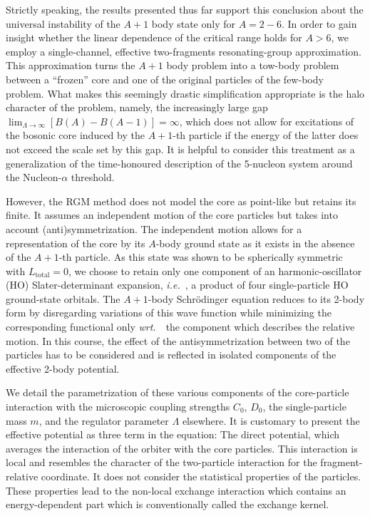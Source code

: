 \documentclass[preprint,12pt]{elsarticle}
\newcommand{\wrt}{\textit{wrt.}~}
\newcommand{\ie}{\textit{i.e.}~}
\begin{document}
Strictly speaking, the results presented thus far support this conclusion about the universal instability of the $A+1$
body state only for $A=2-6$. In order to gain insight whether the linear dependence of the critical range holds for
$A>6$, we employ a single-channel, effective two-fragments resonating-group approximation. This approximation
turns the $A+1$ body problem into a tow-body problem between a ``frozen'' core and one of the original particles of
the few-body problem. What makes this seemingly drastic simplification appropriate is the halo character of the problem,
namely, the increasingly large gap $\lim_{\Lambda\to\infty}\left[B(A)-B(A-1)\right]=\infty$, which does not
allow for excitations of the bosonic core induced by the $A+1$-th particle if the energy of the latter
does not exceed the scale set by this gap. It is helpful to consider this treatment as a generalization of the
time-honoured description of the 5-nucleon system around the Nucleon-$\alpha$ threshold.

However, the RGM method does not model the core as point-like but retains its finite. It assumes
an independent motion of the core particles but takes into account (anti)symmetrization.
The independent motion allows for a representation of the core by
its $A$-body ground state as it exists in the absence of the $A+1$-th particle.
As this state was shown
to be spherically symmetric with $L_\text{total}=0$, we choose to retain only one component of an harmonic-oscillator (HO)
Slater-determinant expansion, \ie, a product of four single-particle HO ground-state orbitals.
The $A+1$-body Schr\"odinger equation reduces to its 2-body form by disregarding variations of this wave function
while minimizing the corresponding functional only \wrt~the component which describes the relative motion.
In this course, the effect of the antisymmetrization between two of the particles has to be considered and is reflected
in isolated components of the effective 2-body potential.

We detail the parametrization of these various components of the core-particle interaction with the
microscopic coupling strengths $C_0$, $D_0$, the single-particle mass $m$, and the regulator parameter $\Lambda$
elsewhere. It is customary to present the effective potential as three term in the equation:
The direct potential, which averages the interaction of the orbiter with the core particles. This interaction is
local and resembles the character of the two-particle interaction for the fragment-relative coordinate. It does not
consider the statistical properties of the particles.
These properties lead to the non-local exchange interaction which contains an energy-dependent part which
is conventionally called the exchange kernel.
\end{document}
